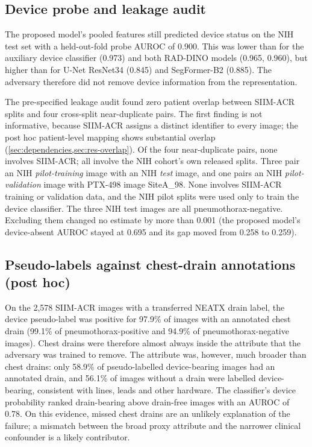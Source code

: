 \documentclass{ieeeaccess}
\begin{document}
\subsection{Device probe and leakage audit}
\label{sec:res-sanity}
The proposed model's pooled features still predicted device status on the NIH test set with a held-out-fold probe AUROC of 0.900. This was lower than for the auxiliary device classifier (0.973) and both RAD-DINO models (0.965, 0.960), but higher than for U-Net ResNet34 (0.845) and SegFormer-B2 (0.885). The adversary therefore did not remove device information from the representation.

The pre-specified leakage audit found zero patient overlap between SIIM-ACR splits and four cross-split near-duplicate pairs. The first finding is not informative, because SIIM-ACR assigns a distinct identifier to every image; the post hoc patient-level mapping shows substantial overlap (\cref{sec:dependencies,sec:res-overlap}). Of the four near-duplicate pairs, none involves SIIM-ACR; all involve the NIH cohort's own released splits. Three pair an NIH \emph{pilot-training} image with an NIH \emph{test} image, and one pairs an NIH \emph{pilot-validation} image with PTX-498 image SiteA\_98. None involves SIIM-ACR training or validation data, and the NIH pilot splits were used only to train the device classifier. The three NIH test images are all pneumothorax-negative. Excluding them changed no estimate by more than 0.001 (the proposed model's device-absent AUROC stayed at 0.695 and its gap moved from 0.258 to 0.259).

\subsection{Pseudo-labels against chest-drain annotations (post hoc)}
\label{sec:res-pseudo}
On the 2{,}578 SIIM-ACR images with a transferred NEATX drain label, the device pseudo-label was positive for 97.9\% of images with an annotated chest drain (99.1\% of pneumothorax-positive and 94.9\% of pneumothorax-negative images). Chest drains were therefore almost always inside the attribute that the adversary was trained to remove. The attribute was, however, much broader than chest drains: only 58.9\% of pseudo-labelled device-bearing images had an annotated drain, and 56.1\% of images without a drain were labelled device-bearing, consistent with lines, leads and other hardware. The classifier's device probability ranked drain-bearing above drain-free images with an AUROC of 0.78. On this evidence, missed chest drains are an unlikely explanation of the failure; a mismatch between the broad proxy attribute and the narrower clinical confounder is a likely contributor.
\end{document}
